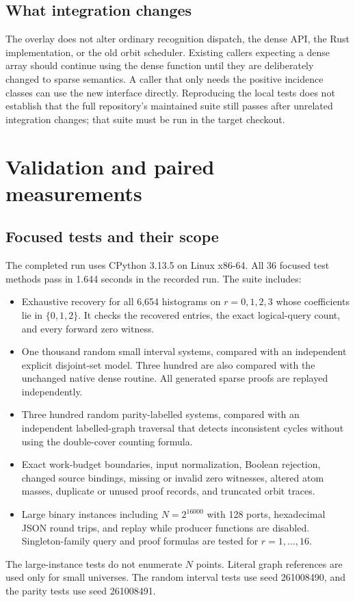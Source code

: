 \documentclass[11pt,letterpaper]{article}
\theoremstyle{definition}
\begin{document}
\subsection{What integration changes}
The overlay does not alter ordinary recognition dispatch, the dense API,
the Rust implementation, or the old orbit scheduler. Existing callers
expecting a dense array should continue using the dense function until they
are deliberately changed to sparse semantics. A caller that only needs the
positive incidence classes can use the new interface directly. Reproducing
the local tests does not establish that the full repository's maintained
suite still passes after unrelated integration changes; that suite must be
run in the target checkout.

\section{Validation and paired measurements}\label{sec:experiments}

\subsection{Focused tests and their scope}
The completed run uses CPython 3.13.5 on Linux x86-64. All 36 focused test
methods pass in 1.644 seconds in the recorded run. The suite includes:
\begin{itemize}[leftmargin=*,itemsep=0.15em]
\item Exhaustive recovery for all 6,654 histograms on $r=0,1,2,3$ whose
coefficients lie in $\{0,1,2\}$. It checks the recovered entries, the exact
logical-query count, and every forward zero witness.
\item One thousand random small interval systems, compared with an
independent explicit disjoint-set model. Three hundred are also compared
with the unchanged native dense routine. All generated sparse proofs are
replayed independently.
\item Three hundred random parity-labelled systems, compared with an
independent labelled-graph traversal that detects inconsistent cycles
without using the double-cover counting formula.
\item Exact work-budget boundaries, input normalization, Boolean rejection,
changed source bindings, missing or invalid zero witnesses, altered atom
masses, duplicate or unused proof records, and truncated orbit traces.
\item Large binary instances including $N=2^{16000}$ with 128 ports,
hexadecimal JSON round trips, and replay while producer functions are
disabled. Singleton-family query and proof formulas are tested for
$r=1,\ldots,16$.
\end{itemize}
The large-instance tests do not enumerate $N$ points. Literal graph
references are used only for small universes. The random interval tests
use seed 261008490, and the parity tests use seed 261008491.
\end{document}

